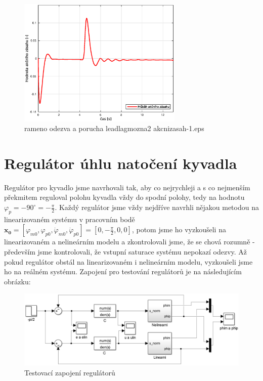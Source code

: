 \documentclass[11pt,a4paper]{article}
\begin{document}
\begin{figure}[H]
\centering
\includegraphics[width=0.7\textwidth]{dobre_grafy/rameno_odezva_a_porucha_leadlagmozna2_akcnizasah-1.eps}
\caption{rameno odezva a porucha leadlagmozna2 akcnizasah-1.eps}
\label{ram_ob2_akc}
\end{figure}


\section{Regulátor úhlu natočení kyvadla}
Regulátor pro kyvadlo jsme navrhovali tak, aby co nejrychleji a s co nejmenším překmitem reguloval polohu kyvadla vždy do spodní polohy, tedy na hodnotu $\varphi_p=-90^{\circ}=-\frac{\pi}{2}$. Každý regulátor jsme vždy nejdříve navrhli nějakou metodou na linearizovaném systému v pracovním bodě $\mathbf{x_0} = \left[\varphi_{m0}, \varphi_{p0}, \dot{\varphi}_{m0}, \dot{\varphi}_{p0}\right] = \left[0, -\frac{\pi}{2}, 0, 0\right]$, potom jsme ho vyzkoušeli na linearizovaném a nelineárním modelu a zkontrolovali jsme, že se chová rozumně - především jsme kontrolovali, že vstupní saturace systému nepokazí odezvy. Až pokud regulátor obstál na linearizovaném i nelineárním modelu, vyzkoušeli jsme ho na reálném systému. Zapojení pro testování regulátorů je na následujícím obrázku:
\begin{figure}[H]
	\centering
    \includegraphics[scale=0.25]{schema_rizeni_nanecisto}
    \caption{Testovací zapojení regulátorů}
\end{figure}
\end{document}
